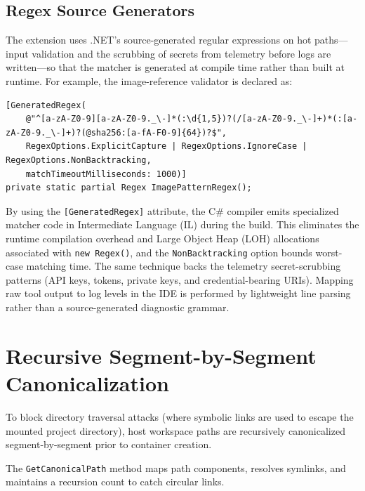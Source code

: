 \subsection{Regex Source Generators}
The extension uses .NET's source-generated regular expressions on hot paths---input validation and the scrubbing of secrets from telemetry before logs are written---so that the matcher is generated at compile time rather than built at runtime. For example, the image-reference validator is declared as:
\begin{lstlisting}[language=CSharp, basicstyle=\ttfamily\scriptsize, caption={Source-generated image-reference validation}, label={lst:regex}]
[GeneratedRegex(
    @"^[a-zA-Z0-9][a-zA-Z0-9._\-]*(:\d{1,5})?(/[a-zA-Z0-9._\-]+)*(:[a-zA-Z0-9._\-]+)?(@sha256:[a-fA-F0-9]{64})?$",
    RegexOptions.ExplicitCapture | RegexOptions.IgnoreCase | RegexOptions.NonBacktracking,
    matchTimeoutMilliseconds: 1000)]
private static partial Regex ImagePatternRegex();
\end{lstlisting}
By using the \texttt{[GeneratedRegex]} attribute, the C\# compiler emits specialized matcher code in Intermediate Language (IL) during the build. This eliminates the runtime compilation overhead and Large Object Heap (LOH) allocations associated with \texttt{new Regex()}, and the \texttt{NonBacktracking} option bounds worst-case matching time. The same technique backs the telemetry secret-scrubbing patterns (API keys, tokens, private keys, and credential-bearing URIs). Mapping raw tool output to log levels in the IDE is performed by lightweight line parsing rather than a source-generated diagnostic grammar.

\section{Recursive Segment-by-Segment Canonicalization}
To block directory traversal attacks (where symbolic links are used to escape the mounted project directory), host workspace paths are recursively canonicalized segment-by-segment prior to container creation.

The \texttt{GetCanonicalPath} method maps path components, resolves symlinks, and maintains a recursion count to catch circular links.

